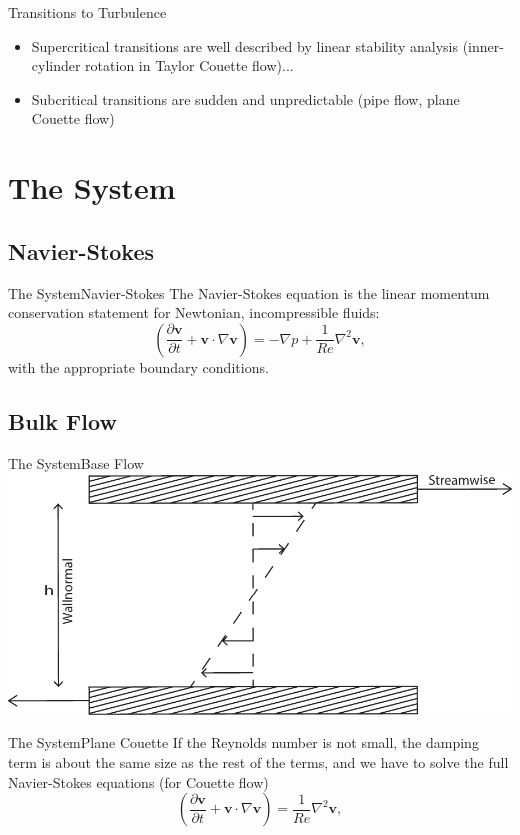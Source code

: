 \documentclass[10pt]{beamer}
\begin{document}
\begin{frame}{Transitions to Turbulence} 
\begin{itemize}
\item<1-> Supercritical transitions are well described by linear stability analysis (inner-cylinder rotation in Taylor Couette flow)...
\item<2-> Subcritical transitions are sudden and unpredictable (pipe flow, plane Couette flow)
\end{itemize}
\end{frame}

\section{The System}
\subsection{Navier-Stokes}
\begin{frame}{The System}{Navier-Stokes}
The Navier-Stokes equation is the linear momentum conservation statement for Newtonian, incompressible fluids:
\begin{equation*}
 \left(\frac{\partial \mathbf{v}}{\partial t} + \mathbf{v} \cdot \nabla \mathbf{v}\right) = -\nabla p + \dfrac{1}{Re} \nabla^2 \mathbf{v},
\end{equation*}
with the appropriate boundary conditions.
\end{frame}
\subsection{Bulk Flow}
\begin{frame}{The System}{Base Flow}
\includegraphics[scale=0.6]{Data/planeCouette}
\end{frame}
\begin{frame}
{The System}{Plane Couette}
If the Reynolds number is not small, the damping term is about the same size as the rest of the terms, and we have to solve the full Navier-Stokes equations (for Couette flow) 
\begin{equation*}
 \left(\frac{\partial \mathbf{v}}{\partial t} + \mathbf{v} \cdot \nabla \mathbf{v}\right) =\dfrac{1}{Re} \nabla^2 \mathbf{v},
\end{equation*}
\end{frame}
\end{document}
